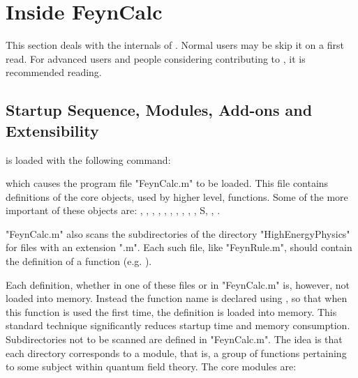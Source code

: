 \section{Inside FeynCalc}
\label{inside}

This section deals with the internals of \fc. Normal users may be skip it on a first read. For advanced users and people considering contributing to \fc, it is recommended reading.

\subsection{Startup Sequence, Modules, Add-ons and Extensibility}
\label{modules}

\fc is loaded with the following command:


which causes the program file "FeynCalc.m" to be loaded. This file contains definitions of the core objects, used by higher level, functions. Some of the more important of these objects are: , , , , , , , , , , S, , .

"FeynCalc.m" also scans the subdirectories of the directory "HighEnergyPhysics" for files with an extension ".m". Each such file, like "FeynRule.m", should contain the definition of a function (e.g. ). 

Each definition, whether in one of these files or in "FeynCalc.m" is, however, not loaded into memory. Instead the function name is declared using , so that when this function is used the first time, the definition is loaded into memory. This standard technique significantly reduces startup time and memory consumption. Subdirectories not to be scanned are defined in "FeynCalc.m". The idea is that each directory corresponds to a module, that is, a group of functions pertaining to some subject within quantum field theory. The core modules are:

